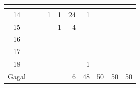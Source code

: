 \begin{minipage}[\minipagealign]{\minipagewidth}
{\begin{tabular}{|c|lllllllll|}
\multicolumn{1}{r|}{} & \multicolumn{1}{r|}{} & \\ \hline 14 & \multicolumn{1}{r|}{} & \multicolumn{1}{r|}{} & \multicolumn{1}{r|}{1} & \multicolumn{1}{r|}{1} & \multicolumn{1}{r|}{24} & \multicolumn{1}{r|}{1} & \multicolumn{1}{r|}{} & \multicolumn{1}{r|}{} & \\ \hline 15 & \multicolumn{1}{r|}{} & \multicolumn{1}{r|}{} & \multicolumn{1}{r|}{} & \multicolumn{1}{r|}{1} & \multicolumn{1}{r|}{4} & \multicolumn{1}{r|}{} & \multicolumn{1}{r|}{} & \multicolumn{1}{r|}{} & \\ \hline 16 & \multicolumn{1}{r|}{} & \multicolumn{1}{r|}{} & \multicolumn{1}{r|}{} & \multicolumn{1}{r|}{} & \multicolumn{1}{r|}{} & \multicolumn{1}{r|}{} & \multicolumn{1}{r|}{} & \multicolumn{1}{r|}{} & \\ \hline 17 & \multicolumn{1}{r|}{} & \multicolumn{1}{r|}{} & \multicolumn{1}{r|}{} & \multicolumn{1}{r|}{} & \multicolumn{1}{r|}{} & \multicolumn{1}{r|}{} & \multicolumn{1}{r|}{} & \multicolumn{1}{r|}{} & \\ \hline 18 & \multicolumn{1}{r|}{} & \multicolumn{1}{r|}{} & \multicolumn{1}{r|}{} & \multicolumn{1}{r|}{} & \multicolumn{1}{r|}{} & \multicolumn{1}{r|}{1} & \multicolumn{1}{r|}{} & \multicolumn{1}{r|}{} & \\ \hline Gagal & \multicolumn{1}{r|}{} & \multicolumn{1}{r|}{} & \multicolumn{1}{r|}{} & \multicolumn{1}{r|}{} & \multicolumn{1}{r|}{6} & \multicolumn{1}{r|}{48} & \multicolumn{1}{r|}{50} & \multicolumn{1}{r|}{50} & 50 \\ \hline
		\end{tabular}
	}
	\label{tab:freq-emd-large-lia}
\end{minipage}
